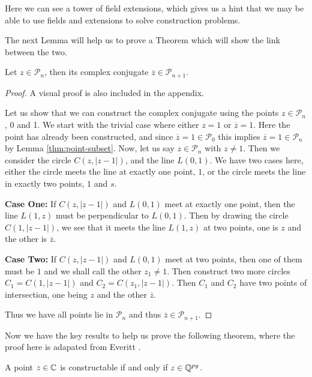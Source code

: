 Here we can see a tower of field extensions, which gives us a hint that we may be able to use fields and extensions to solve construction problems.

The next Lemma will help us to prove a Theorem which will show the link between the two.

\begin{lemma}\label{lemma:conjugate-in-Pn}
    Let $z \in \mathcal{P}_n$, then its complex conjugate $\overline{z} \in \mathcal{P}_{n+1}$.
\end{lemma}

\begin{proof}  
    A visual proof is also included in the appendix.
    
    Let us show that we can construct the complex conjugate using the points $z\in \mathcal{P}_n$, 0 and 1.
    We start with the trivial case where either $z=1$ or $\overline{z}=1$. Here the point has already been constructed, and since $\overline{z}=1\in \mathcal{P}_0$ this implies $\overline{z}=1\in \mathcal{P}_n$ by Lemma \ref{thm:point-subset}.
\newline
\noindent
    Now, let us say $z\in \mathcal{P}_n$ with $z\neq1$. Then we consider the circle $C(z,|z-1|)$, and the line $L(0,1)$. We have two cases here, either the circle meets the line at exactly one point, $1$, or the circle meets the line in exactly two points, $1$ and $s$.

    \textbf{Case One:} If $C(z,|z-1|)$ and $L(0,1)$ meet at exactly one point, then the line $L(1,z)$ must be perpendicular to $L(0,1)$. Then by drawing the circle $C(1,|z-1|)$, we see that it meets the line $L(1,z)$ at two points, one is $z$ and the other is $\overline{z}$.

    \textbf{Case Two:} If $C(z,|z-1|)$ and $L(0,1)$ meet at two points, then one of them must be $1$ and we shall call the other $z_1\neq1$. Then construct two more circles $C_1=C(1,|z-1|)$ and $C_2=C(z_1,|z-1|)$. Then $C_1$ and $C_2$ have two points of intersection, one being $z$ and the other $\overline{z}$.

    Thus we have all points lie in $\mathcal{P}_n$ and thus $\overline{z} \in \mathcal{P}_{n+1}$.
\end{proof}

Now we have the key results to help us prove the following theorem, where the proof here is adapated from Everitt \cite{constructions-and-galois}.

\begin{theorem}
    A point $z \in \mathbb C$ is constructable if and only if $z \in \mathbb Q^{py}$.
\end{theorem}

